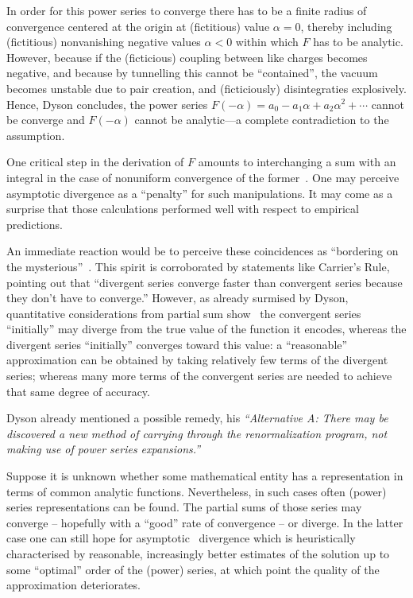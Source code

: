 \documentclass[%
  twocolumn,
 showpacs,
 showkeys,
 preprintnumbers,
 amsmath,amssymb,
 aps,
  pra,
  longbibliography,
 ]{revtex4-1}
\begin{document}
In order for this power series to converge there has to be a finite radius of convergence
centered at the origin at (fictitious) value $\alpha=0$,
thereby including (fictitious) nonvanishing negative values $\alpha < 0$
within which $F$ has to be analytic.
However, because if the (ficticious) coupling between like charges becomes negative, and because by tunnelling this cannot be ``contained'',
the vacuum becomes unstable due to pair creation, and (ficticiously) disintegraties explosively.
Hence, Dyson concludes,
the power series $F(-\alpha )=a_0-a_1\alpha + a_2\alpha^2+ \cdots $ cannot be converge and $F(-\alpha )$
cannot be analytic---a complete contradiction to the assumption.

One critical step in the derivation of $F$
amounts to interchanging a sum with an integral
in the case of nonuniform convergence of the former~\cite[Sect.~II.A]{PhysRevD.57.1144}.
One may perceive asymptotic divergence as a ``penalty'' for such manipulations.
It may come as a surprise that those calculations performed well with respect to empirical predictions.

An immediate reaction would be to perceive these coincidences as ``bordering on the mysterious''~\cite{wigner}.
This spirit is corroborated by statements like Carrier's Rule, pointing out that
``divergent series converge faster than convergent series because they don't have to converge.''
However, as already surmised by Dyson, quantitative considerations from partial sum show~\cite[p.~4]{Bleistein-Handelsman}
the convergent series ``initially'' may diverge from
the true value of the function it encodes, whereas the divergent series ``initially'' converges toward
this value: a ``reasonable'' approximation can be obtained by taking
relatively few terms of the divergent series; whereas many more terms of the
convergent series are needed to achieve that same degree of accuracy.

Dyson already mentioned a possible remedy, his
{\em ``Alternative A: There may be discovered a new method
of carrying through the renormalization program, not making use of power series expansions.''}



Suppose it is unknown whether some mathematical entity has a representation
in terms of common analytic functions.
Nevertheless, in such cases often (power) series representations can be found.
The partial sums of those series may converge -- hopefully with a ``good'' rate of convergence -- or diverge.
In the latter case one can still hope for asymptotic~\cite{Erdelyi-1956,Dingle-1973,Bender-Orszag}
divergence which is heuristically
characterised by reasonable, increasingly better estimates of the  solution up to some ``optimal'' order of the (power) series,
at which point the quality of the approximation deteriorates.
\end{document}
